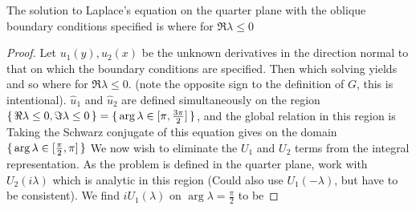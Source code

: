 \documentclass{article}
\begin{document}
\begin{theorem}
The solution to Laplace's equation on the quarter plane with the oblique boundary conditions specified is 
where
for $\Re \lambda \leq 0$
\end{theorem}
\begin{proof}
Let $u_1(y),u_2(x)$ be the unknown derivatives in the direction normal to that on which the boundary conditions are specified. Then 
which solving yields
and so 
where 
for $\Re\lambda \leq 0$. (note the opposite sign to the definition of $G$, this is intentional). $\hat{u}_1$ and $\hat{u}_2$ are defined simultaneously on the region $\set{\Re\lambda \leq 0, \Im\lambda \leq 0} = \set{\arg\lambda \in [\pi , \frac{3\pi}{2}]}$, and the global relation in this region is 
Taking the Schwarz conjugate of this equation gives 
on the domain $\set{\arg\lambda\in[\frac{\pi}{2},\pi]}$
We now wish to eliminate the $U_1$ and $U_2$ terms from the integral representation. As the problem is defined in the quarter plane, work with $U_2(i\lambda)$ which is analytic in this region (Could also use $U_1(-\lambda)$, but have to be consistent). We find $iU_1(\lambda)$ on $\arg\lambda = \frac{\pi}{2}$ to be  

\end{proof}
\end{document}

